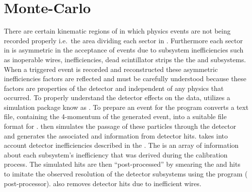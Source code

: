 \section{\label{sec:analysis.simulation}Monte-Carlo}
	There are certain kinematic regions of  in which physics events are not being recorded properly i.e.~the area dividing each sector in . Furthermore each sector in  is asymmetric in the acceptance of events due to subsystem inefficiencies such as inoperable  wires,  inefficiencies, dead scintillator strips the the  and  subsystems. When a triggered event is recorded and reconstructed these asymmetric inefficiencies factors are reflected and must be carefully understood because these factors are properties of the  detector and independent of any physics that occurred. To properly understand the detector effects on the data,  utilizes a  simulation package know as . To prepare an event for  the program  converts a text file, containing the 4-momentum of the generated event, into a suitable file format for .  then simulates the passage of these particles through the  detector and generates the associated  and  information from detector hits.  takes into account detector inefficiencies described in the . The  is an array of information about each subsystem's inefficiency that was derived during the  calibration process. The  simulated hits are then ``post-processed'' by smearing the  and  hits to imitate the observed resolution of the detector subsystems using the program  ( post-processor).  also removes detector hits due to inefficient  wires.
	
